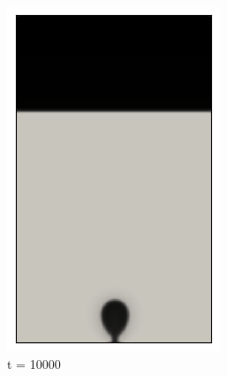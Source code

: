 \begin{figure}[H]
\begin{subfigure}{0.25\textwidth}
		\includegraphics[width=\linewidth]{figs/cap4/cuda_bb_760_s10}
		\caption{t = 10000}
		\label{fig:2}
	\end{subfigure}\hfil 
	\begin{subfigure}{0.25\textwidth}

\end{subfigure}
\end{figure}

